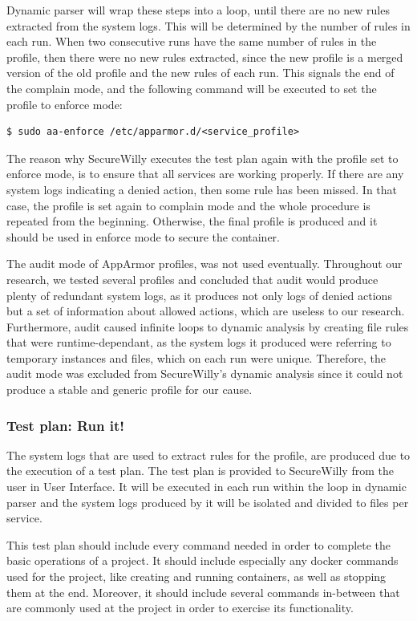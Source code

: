 Dynamic parser will wrap these steps into a loop, until there are no new rules extracted from the system logs. This will be determined by the number of rules in each run. When two consecutive runs have the same number of rules in the profile, then there were no new rules extracted, since the new profile is a merged version of the old profile and the new rules of each run. This signals the end of the complain mode, and the following command will be executed to set the profile to enforce mode:

\begin{lstlisting}[style=dockercommands]
$ sudo aa-enforce /etc/apparmor.d/<service_profile>
\end{lstlisting}

The reason why SecureWilly executes the test plan again with the profile set to enforce mode, is to ensure that all services are working properly. If there are any system logs indicating a denied action, then some rule has been missed. In that case, the profile is set again to complain mode and the whole procedure is repeated from the beginning. Otherwise, the final profile is produced and it should be used in enforce mode to secure the container.

The audit mode of AppArmor profiles, was not used eventually. Throughout our research, we tested several profiles and concluded that audit would produce plenty of redundant system logs, as it produces not only logs of denied actions but a set of information about allowed actions, which are useless to our research. Furthermore, audit caused infinite loops to dynamic analysis by creating file rules that were runtime-dependant, as the system logs it produced were referring to temporary instances and files, which on each run were unique. Therefore, the audit mode was excluded from SecureWilly's dynamic analysis since it could not produce a stable and generic profile for our cause.

\subsubsection{Test plan: Run it!}
The system logs that are used to extract rules for the profile, are produced due to the execution of a test plan. The test plan is provided to SecureWilly from the user in User Interface. It will be executed in each run within the loop in dynamic parser and the system logs produced by it will be isolated and divided to files per service.

This test plan should include every command needed in order to complete the basic operations of a project. It should include especially any docker commands used for the project, like creating and running containers, as well as stopping them at the end. Moreover, it should include several commands in-between that are commonly used at the project in order to exercise its functionality.

